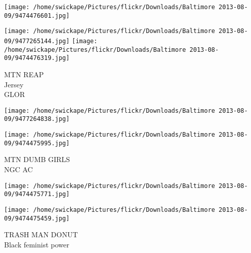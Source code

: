 \documentclass[10pt,letterpaper]{article}
\begin{document}
\texttt{[image: /home/swickape/Pictures/flickr/Downloads/Baltimore 2013-08-09/9474476601.jpg]}

\vspace{0.25in}
\texttt{[image: /home/swickape/Pictures/flickr/Downloads/Baltimore 2013-08-09/9477265144.jpg]}
\texttt{[image: /home/swickape/Pictures/flickr/Downloads/Baltimore 2013-08-09/9474476319.jpg]}

MTN REAP\\
Jersey\\
GLOR
\pagebreak

\texttt{[image: /home/swickape/Pictures/flickr/Downloads/Baltimore 2013-08-09/9477264838.jpg]}

\vspace{0.25in}
\texttt{[image: /home/swickape/Pictures/flickr/Downloads/Baltimore 2013-08-09/9474475995.jpg]}

MTN DUMB GIRLS\\
NGC AC
\pagebreak

\texttt{[image: /home/swickape/Pictures/flickr/Downloads/Baltimore 2013-08-09/9474475771.jpg]}

\vspace{0.25in}
\texttt{[image: /home/swickape/Pictures/flickr/Downloads/Baltimore 2013-08-09/9474475459.jpg]}

TRASH MAN DONUT\\
Black feminist power
\pagebreak
\end{document}
